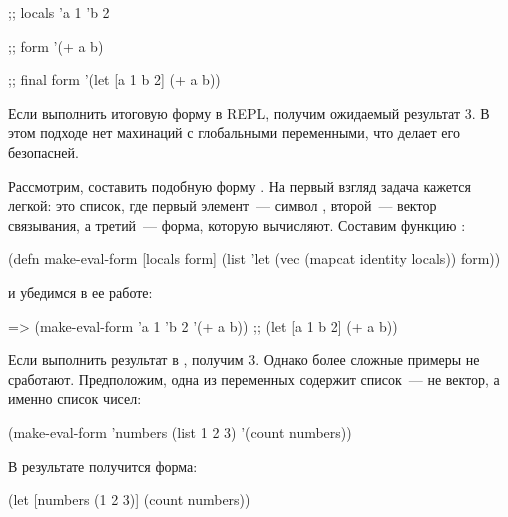 \begin{english}
  \begin{clojure}
;; locals
{'a 1 'b 2}

;; form
'(+ a b)

;; final form
'(let [a 1 b 2]
   (+ a b))
  \end{clojure}
\end{english}

Если выполнить итоговую форму в REPL, получим ожидаемый результат 3. В этом подходе нет махинаций с глобальными переменными, что делает его безопасней.

Рассмотрим, составить подобную форму . На первый взгляд задача кажется легкой: это список, где первый элемент~--- символ , второй~--- вектор связывания, а третий~--- форма, которую вычисляют. Составим функцию :

\begin{english}
  \begin{clojure}
(defn make-eval-form [locals form]
  (list 'let (vec (mapcat identity locals)) form))
  \end{clojure}
\end{english}

и убедимся в ее работе:

\begin{english}
  \begin{clojure}
=> (make-eval-form {'a 1 'b 2} '(+ a b))
;; (let [a 1 b 2] (+ a b))
  \end{clojure}
\end{english}

Если выполнить результат в , получим 3. Однако более сложные примеры не сработают. Предположим, одна из переменных содержит список~--- не вектор, а именно список чисел:

\begin{english}
  \begin{clojure}
(make-eval-form {'numbers (list 1 2 3)}
                '(count numbers))
  \end{clojure}
\end{english}

В результате получится форма:

\begin{english}
  \begin{clojure}
(let [numbers (1 2 3)]
  (count numbers))
  \end{clojure}
\end{english}

